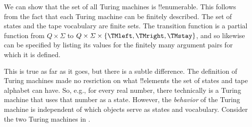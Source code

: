 \documentclass[../../../include/open-logic-section]{subfiles}
\begin{document}

\begin{explain}
We can show that the set of all Turing machines is !!{enumerable}.
This follows from the fact that each Turing machine can be finitely
described.  The set of states and the tape vocabulary are finite sets.
The transition function is a partial function from $Q \times \Sigma$
to $Q \times \Sigma \times \{\TMleft, \TMright, \TMstay\}$, and so
likewise can be specified by listing its values for the finitely many
argument pairs for which it is defined.

This is true as far as it goes, but there is a subtle difference. The
definition of Turing machines made no resriction on what !!{element}s
the set of states and tape alphabet can have. So, e.g., for every real
number, there technically is a Turing machine that uses that number as
a state. However, the \emph{behavior} of the Turing machine is
independent of which objects serve as states and vocabulary. Consider
the two Turing machines in .
\begin{figure}
\begin{center}
\\
\end{center}
\end{figure}
\end{explain}
\end{document}
